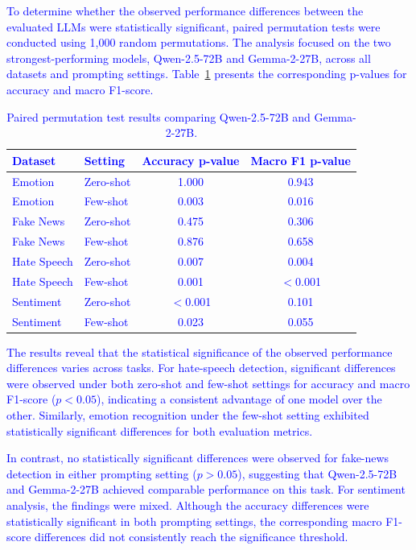 \documentclass[10pt,letterpaper]{article}
\newcommand{\rev}[1]{\textcolor{blue}{#1}}
\begin{document}
\rev{To determine whether the observed performance differences between the evaluated LLMs were statistically significant, paired permutation tests were conducted using 1,000 random permutations. The analysis focused on the two strongest-performing models, Qwen-2.5-72B and Gemma-2-27B, across all datasets and prompting settings. Table~\ref{tab:significance_results} presents the corresponding p-values for accuracy and macro F1-score.}

\begin{table}[!t]
\centering
\small
\caption{\rev{Paired permutation test results comparing Qwen-2.5-72B and Gemma-2-27B.}}
\label{tab:significance_results}
\renewcommand{\arraystretch}{1.1}
\setlength{\tabcolsep}{5pt}
\begin{tabular}{|l|l|c|c|}
\hline
\textbf{\rev{Dataset}} & \textbf{\rev{Setting}} & \textbf{\rev{Accuracy p-value}} & \textbf{\rev{Macro F1 p-value}} \\ 
\hline
\rev{Emotion} & \rev{Zero-shot} & \rev{1.000} & \rev{0.943} \\ 
\rev{Emotion} & \rev{Few-shot} & \rev{0.003} & \rev{0.016} \\ 
\hline
\rev{Fake News} & \rev{Zero-shot} & \rev{0.475} & \rev{0.306} \\ 
\rev{Fake News} & \rev{Few-shot} & \rev{0.876} & \rev{0.658} \\ 
\hline
\rev{Hate Speech} & \rev{Zero-shot} & \rev{0.007} & \rev{0.004} \\ 
\rev{Hate Speech} & \rev{Few-shot} & \rev{0.001} & \rev{$<$0.001} \\ 
\hline
\rev{Sentiment} & \rev{Zero-shot} & \rev{$<$0.001} & \rev{0.101} \\ 
\rev{Sentiment} & \rev{Few-shot} & \rev{0.023} & \rev{0.055} \\ 
\hline
\end{tabular}
\end{table}

\rev{The results reveal that the statistical significance of the observed performance differences varies across tasks. For hate-speech detection, significant differences were observed under both zero-shot and few-shot settings for accuracy and macro F1-score ($p < 0.05$), indicating a consistent advantage of one model over the other. Similarly, emotion recognition under the few-shot setting exhibited statistically significant differences for both evaluation metrics.}

\rev{In contrast, no statistically significant differences were observed for fake-news detection in either prompting setting ($p > 0.05$), suggesting that Qwen-2.5-72B and Gemma-2-27B achieved comparable performance on this task. For sentiment analysis, the findings were mixed. Although the accuracy differences were statistically significant in both prompting settings, the corresponding macro F1-score differences did not consistently reach the significance threshold.}
\end{document}

